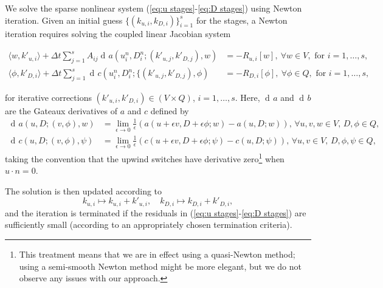\documentclass[a4paper, 12pt]{article}
\DeclareMathOperator{\diff}{d}
\DeclareMathOperator{\gat}{\diff\!}
\begin{document}
We solve the sparse nonlinear system (\ref{eq:u stages}-\ref{eq:D
  stages}) using Newton iteration. Given an initial guess $\{(k_{u,i},
k_{D,i})\}_{i=1}^s$ for the stages, a Newton iteration requires solving
the coupled linear Jacobian system
\begin{small}
\begin{align}
  \label{eq:u J}
    \langle w, k'_{u,i} \rangle +
  \Delta t\sum_{j=1}^sA_{ij}\gat a\left(u^n_i,D^n_i;(k'_{u,j}, k'_{D,j}),
  w\right) &=  -R_{u,i}[w],
  \  \forall w \in V,\mbox{ for }i=1,\ldots,s, \\
  \label{eq:D J}
  \langle \phi, k'_{D,i} \rangle
  + \Delta t\sum_{j=1}^s\gat c\left(u^n_i,D^n_i;\{(k'_{u,j}, k'_{D,j}),
  \phi\right)  &= -R_{D,i}[\phi],
  \ \forall \phi \in Q,\mbox{ for }i=1,\ldots,s,
\end{align}
\end{small}
for iterative corrections $(k'_{u,i}, k'_{D,i})\in (V\times Q)$,
$i=1,\ldots,s$. Here, $\gat a$ and $\gat b$ are the Gateaux
derivatives of $a$ and $c$ defined by
\begin{align}
  \gat a(u,D;(v,\phi),w) & = \lim_{\epsilon\to 0}
  \frac{1}{\epsilon}(a(u+\epsilon v,D+\epsilon \phi; w)
  - a(u,D;w)),  \, \forall u,v,w \in V, \, D,\phi \in Q, \\
  \gat c(u,D;(v,\phi),\psi) & = \lim_{\epsilon\to 0}
  \frac{1}{\epsilon}(c(u+\epsilon v,D+\epsilon \phi; \psi)
  - c(u,D;\psi)), \, \forall u,v \in V,\, D,\phi,\psi \in Q,
\end{align}
taking the convention that the upwind switches have derivative
zero\footnote{This treatment means that we are in effect using a
quasi-Newton method; using a semi-smooth Newton method might be
more elegant, but we do not observe any issues with our approach.}
when $u\cdot n=0$.

The solution is then updated according to
\begin{equation}
  k_{u,i}\mapsto k_{u,i} + k'_{u,i}, \quad
  k_{D,i}\mapsto k_{D,i} + k'_{D,i},
\end{equation}
and the iteration is terminated if the residuals in (\ref{eq:u
  stages}-\ref{eq:D stages}) are sufficiently small (according
to an appropriately chosen termination criteria).
\end{document}
